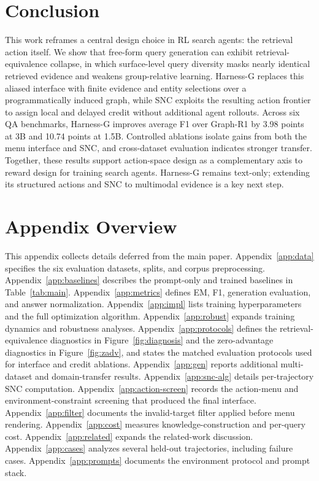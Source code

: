 \documentclass[letterpaper]{article} %
\begin{document}
\section{Conclusion}

This work reframes a central design choice in RL search agents: the
retrieval action itself.
We show that free-form query generation can exhibit
retrieval-equivalence collapse, in which surface-level query diversity
masks nearly identical retrieved evidence and weakens group-relative
learning.
Harness-G replaces this aliased interface with finite evidence and entity
selections over a programmatically induced graph, while SNC exploits the
resulting action frontier to assign local and delayed credit without
additional agent rollouts.
Across six QA benchmarks, Harness-G improves average F1 over Graph-R1 by
3.98 points at 3B and 10.74 points at 1.5B.
Controlled ablations isolate gains from both the menu interface and SNC,
and cross-dataset evaluation indicates stronger transfer.
Together, these results support action-space design as a complementary
axis to reward design for training search agents.
Harness-G remains text-only; extending its structured actions and SNC to
multimodal evidence is a key next step.



\clearpage
\appendix
\setcounter{secnumdepth}{2}

\section{Appendix Overview}
\label{app:overview}

This appendix collects details deferred from the main paper.
Appendix~\ref{app:data} specifies the six evaluation datasets, splits, and corpus preprocessing.
Appendix~\ref{app:baselines} describes the prompt-only and trained baselines in Table~\ref{tab:main}.
Appendix~\ref{app:metrics} defines EM, F1, generation evaluation, and answer normalization.
Appendix~\ref{app:impl} lists training hyperparameters and the full optimization algorithm.
Appendix~\ref{app:robust} expands training dynamics and robustness analyses.
Appendix~\ref{app:protocols} defines the retrieval-equivalence diagnostics in Figure~\ref{fig:diagnosis} and the zero-advantage diagnostics in Figure~\ref{fig:zadv}, and states the matched evaluation protocols used for interface and credit ablations.
Appendix~\ref{app:gen} reports additional multi-dataset and domain-transfer results.
Appendix~\ref{app:snc-alg} details per-trajectory SNC computation.
Appendix~\ref{app:action-screen} records the action-menu and environment-constraint screening that produced the final interface.
Appendix~\ref{app:filter} documents the invalid-target filter applied before menu rendering.
Appendix~\ref{app:cost} measures knowledge-construction and per-query cost.
Appendix~\ref{app:related} expands the related-work discussion.
Appendix~\ref{app:cases} analyzes several held-out trajectories, including failure cases.
Appendix~\ref{app:prompts} documents the environment protocol and prompt stack.
\end{document}

